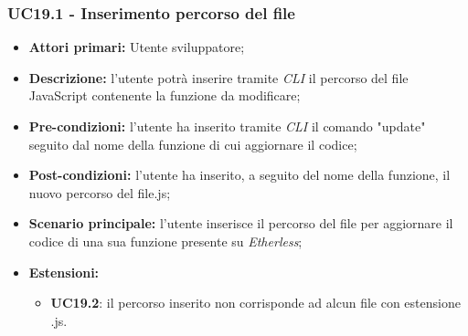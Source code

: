 \subsubsection{UC19.1 - Inserimento percorso del file}
\begin{itemize}
	\item \textbf{Attori primari:} Utente sviluppatore;
	\item \textbf{Descrizione:} l'utente potrà inserire tramite \textit{CLI\glo} il percorso del file JavaScript contenente la funzione da modificare; 
	\item \textbf{Pre-condizioni:} l'utente ha inserito tramite \textit{CLI\glo} il comando "update" seguito dal nome della funzione di cui aggiornare il codice;
	\item \textbf{Post-condizioni:} l'utente ha inserito, a seguito del nome della funzione, il nuovo percorso del file.js;
	\item \textbf{Scenario principale:} l'utente inserisce il percorso del file per aggiornare il codice di una sua funzione presente su \textit{Etherless};
	\item \textbf{Estensioni:} 
	\begin{itemize}
		\item \textbf{UC19.2}: il percorso inserito non corrisponde ad alcun file con estensione .js.
	\end{itemize}
\end{itemize}